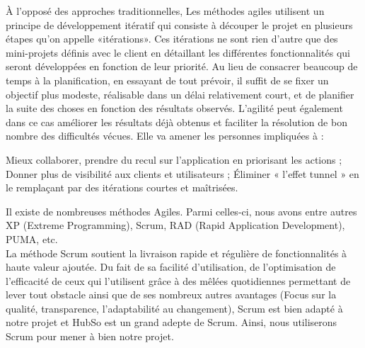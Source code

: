 À l’opposé des approches traditionnelles, Les méthodes agiles utilisent un principe de développement itératif qui consiste à découper le projet en plusieurs étapes qu’on appelle «itérations». Ces itérations ne sont rien d’autre que des mini-projets définis avec le client en détaillant les différentes fonctionnalités qui seront développées en fonction de leur priorité. Au lieu de consacrer beaucoup de temps à la planification, en essayant de tout prévoir, il suffit de se fixer un objectif plus modeste, réalisable dans un délai relativement court, et de planifier la suite des choses en fonction des résultats observés. L’agilité peut également dans ce cas améliorer les résultats déjà obtenus et faciliter la résolution de bon nombre des difficultés vécues. Elle va amener les personnes impliquées à :
\begin{itemize}
	\itemtirait Mieux collaborer, prendre du recul sur l’application en priorisant les actions ;
	\itemtirait Donner plus de visibilité aux clients et utilisateurs ;
	\itemtirait Éliminer « l’effet tunnel »  en le remplaçant par des itérations courtes et maîtrisées.
\end{itemize}
Il existe de nombreuses méthodes Agiles. Parmi celles-ci, nous avons entre autres XP (Extreme Programming), Scrum, RAD (Rapid Application Development), PUMA, etc. \\
La méthode Scrum soutient la livraison rapide et régulière de fonctionnalités à haute valeur ajoutée.
Du fait de sa facilité d'utilisation, de l'optimisation de l'efficacité de ceux qui l'utilisent grâce à des mêlées quotidiennes permettant de lever tout obstacle ainsi que de ses nombreux autres avantages (Focus sur la qualité, transparence, l'adaptabilité au changement), Scrum est bien adapté à notre projet et HubSo est un grand adepte de Scrum. Ainsi, nous utiliserons Scrum pour mener à bien notre projet.
